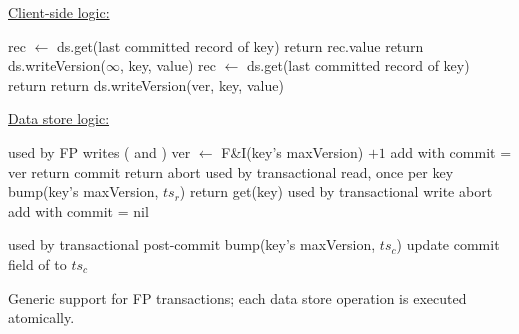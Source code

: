 \begin{algorithm}[htb]
\small

\underline{Client-side logic:}
\begin{algorithmic}[1]
{} \label{l:brc}
\State rec  $\leftarrow$ ds.get(last committed record of key) 
\State  return rec.value
\EndProcedure
{} 
	\State return {ds.writeVersion}($\infty$, key, value)
\EndProcedure
{} 
\State rec  $\leftarrow$ ds.get(last committed record of key) 
\State  return 
\EndProcedure
{} 
\State return {ds.writeVersion}(ver, key, value)
\EndProcedure
\Statex
{}
\end{algorithmic}

\underline{Data store logic:}
\begin{algorithmic}[1]
{} 
\Statex \Comment used by FP writes ( and )
		\State ver $\leftarrow$ F\&I(key's maxVersion) $+1$   \label{l:fi}
		\State add  with commit = ver  
		\State return commit
	\Else 
		\State return abort 
	\EndIf
\EndProcedure
{}   \label{l:txr}
\Statex \Comment used by transactional read, once per key 
\State bump(key's maxVersion, $ts_r$)
\State return get(key)
\EndProcedure
{}   \label{l:txw}
 \Statex \Comment used by transactional write
 	\State abort 
 \EndIf
 \State add  with commit = nil  
\EndProcedure

   \label{l:txu}
\Statex \Comment used by transactional post-commit 
\State bump(key's maxVersion, $ts_c$)
\State update commit field of  to $ts_c$
\EndProcedure
\end{algorithmic}
\caption{Generic support for FP transactions; each data store operation is executed atomically.}
\label{alg:fp}
\end{algorithm}

